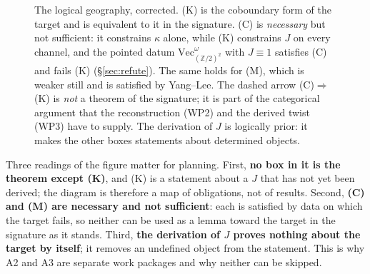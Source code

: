 \documentclass[11pt,a4paper]{article}
\theoremstyle{remark}
\newcommand{\Vect}{\mathrm{Vec}}
\newcommand{\Z}{\mathbb{Z}}
\begin{document}
\begin{figure}[t]
\centering
{}
\caption{The logical geography, corrected. (K) is the coboundary form of the target and is
equivalent to it in the signature. (C) is \emph{necessary} but not sufficient: it constrains
$\kappa$ alone, while (K) constrains $J$ on every channel, and the pointed datum
$\Vect^{\omega}_{(\Z/2)^2}$ with $J \equiv 1$ satisfies (C) and fails (K)
(\S\ref{sec:refute}). The same holds for (M), which is weaker still and is satisfied by
Yang--Lee. The dashed arrow (C)$\Rightarrow$(K) is \emph{not} a theorem of the signature; it is
part of the categorical argument that the reconstruction (WP2) and the derived twist (WP3) have
to supply. The derivation of $J$ is logically prior: it makes the other boxes statements about
determined objects.}
\label{fig:logic}
\end{figure}

Three readings of the figure matter for planning. First, \textbf{no box in it is the theorem
except (K)}, and (K) is a statement about a $J$ that has not yet been derived; the diagram is
therefore a map of obligations, not of results. Second, \textbf{(C) and (M) are necessary and
not sufficient}: each is satisfied by data on which the target fails, so neither can be used as
a lemma toward the target in the signature as it stands. Third, \textbf{the derivation of $J$
proves nothing about the target by itself}; it removes an undefined object from the statement.
This is why A2 and A3 are separate work packages and why neither can be skipped.
\end{document}
